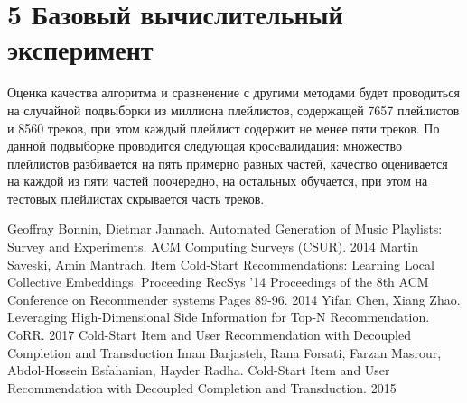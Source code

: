\documentclass[12pt,twoside]{article}
\begin{document}
\section{5 Базовый вычислительный эксперимент}

Оценка качества алгоритма и сравненение с другими методами будет проводиться на случайной подвыборки из миллиона плейлистов, содержащей 7657 плейлистов и 8560 треков, при этом каждый плейлист содержит не менее пяти треков. По данной подвыборке проводится следующая кросcвалидация: множество плейлистов разбивается на пять примерно равных частей, качество оценивается на каждой из пяти частей поочередно, на остальных обучается, при этом на тестовых плейлистах скрывается часть треков.

  

\begin{thebibliography}{4}
 Geoffray Bonnin,  	Dietmar Jannach. Automated Generation of Music Playlists: Survey and Experiments. ACM Computing Surveys (CSUR). 2014
Martin Saveski, Amin Mantrach. Item Cold-Start Recommendations:
Learning Local Collective Embeddings. Proceeding
RecSys '14 Proceedings of the 8th ACM Conference on Recommender systems
Pages 89-96. 2014
Yifan Chen, Xiang Zhao. Leveraging High-Dimensional Side Information for Top-N Recommendation. CoRR. 2017
Cold-Start Item and User Recommendation with Decoupled Completion and Transduction
Iman Barjasteh, Rana Forsati, Farzan Masrour, Abdol-Hossein Esfahanian, Hayder Radha. Cold-Start Item and User Recommendation with Decoupled Completion and Transduction. 2015
\end{thebibliography}
\end{document}
